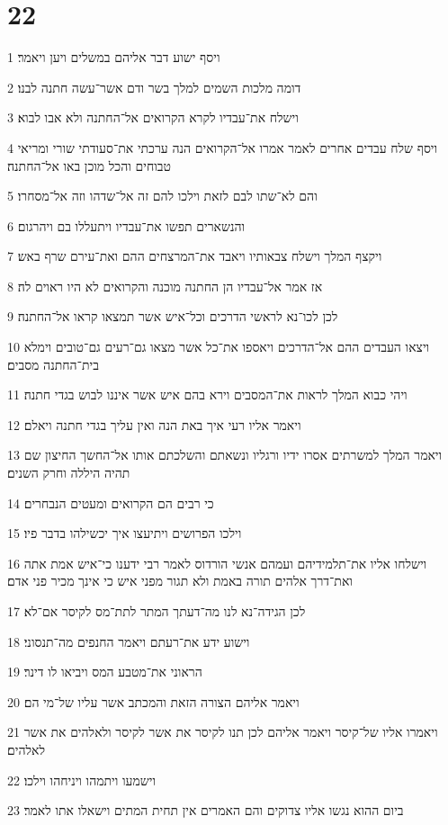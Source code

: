 \chapter{22}

\par 1 ויסף ישוע דבר אליהם במשלים ויען ויאמר׃
\par 2 דומה מלכות השמים למלך בשר ודם אשר־עשה חתנה לבנו׃
\par 3 וישלח את־עבדיו לקרא הקרואים אל־החתנה ולא אבו לבוא׃
\par 4 ויסף שלח עבדים אחרים לאמר אמרו אל־הקרואים הנה ערכתי את־סעודתי שורי ומריאי טבוחים והכל מוכן באו אל־החתנה׃
\par 5 והם לא־שתו לבם לזאת וילכו להם זה אל־שדהו וזה אל־מסחרו׃
\par 6 והנשארים תפשו את־עבדיו ויתעללו בם ויהרגום׃
\par 7 ויקצף המלך וישלח צבאותיו ויאבד את־המרצחים ההם ואת־עירם שרף באש׃
\par 8 אז אמר אל־עבדיו הן החתנה מוכנה והקרואים לא היו ראוים לה׃
\par 9 לכן לכו־נא לראשי הדרכים וכל־איש אשר תמצאו קראו אל־החתנה׃
\par 10 ויצאו העבדים ההם אל־הדרכים ויאספו את־כל אשר מצאו גם־רעים גם־טובים וימלא בית־החתנה מסבים׃
\par 11 ויהי כבוא המלך לראות את־המסבים וירא בהם איש אשר איננו לבוש בגדי חתנה׃
\par 12 ויאמר אליו רעי איך באת הנה ואין עליך בגדי חתנה ויאלם׃
\par 13 ויאמר המלך למשרתים אסרו ידיו ורגליו ונשאתם והשלכתם אותו אל־החשך החיצון שם תהיה היללה וחרק השנים׃
\par 14 כי רבים הם הקרואים ומעטים הנבחרים׃
\par 15 וילכו הפרושים ויתיעצו איך יכשילהו בדבר פיו׃
\par 16 וישלחו אליו את־תלמידיהם ועמהם אנשי הורדוס לאמר רבי ידענו כי־איש אמת אתה ואת־דרך אלהים תורה באמת ולא תגור מפני איש כי אינך מכיר פני אדם׃
\par 17 לכן הגידה־נא לנו מה־דעתך המתר לתת־מס לקיסר אם־לא׃
\par 18 וישוע ידע את־רעתם ויאמר החנפים מה־תנסוני׃
\par 19 הראוני את־מטבע המס ויביאו לו דינר׃
\par 20 ויאמר אליהם הצורה הזאת והמכתב אשר עליו של־מי הם׃
\par 21 ויאמרו אליו של־קיסר ויאמר אליהם לכן תנו לקיסר את אשר לקיסר ולאלהים את אשר לאלהים׃
\par 22 וישמעו ויתמהו ויניחהו וילכו׃
\par 23 ביום ההוא נגשו אליו צדוקים והם האמרים אין תחית המתים וישאלו אתו לאמר׃
